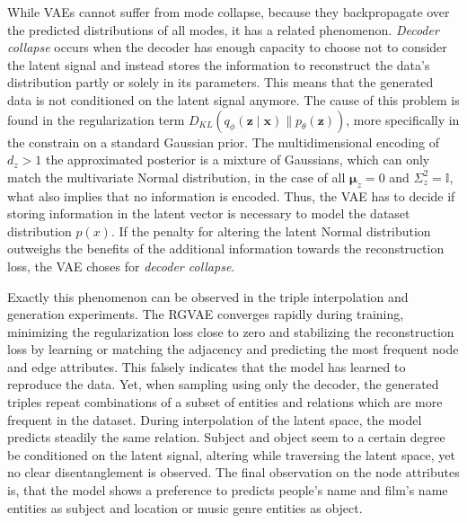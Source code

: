 While VAEs cannot suffer from mode collapse, because they backpropagate over the predicted distributions of all modes, it has a related phenomenon. \textit{Decoder collapse} occurs when the decoder has enough capacity to choose not to consider the latent signal and instead stores the information to reconstruct the data's distribution partly or solely in its parameters. This means that the generated data is not conditioned on the latent signal anymore. The cause of this problem is found in the regularization term $D_{K L}\left(q_{{\phi}}\left(\mathbf{z} \mid \mathbf{x}\right) \| p_{{\theta}}(\mathbf{z})\right)$, more specifically in the constrain on a standard Gaussian prior. The multidimensional encoding of $d_z>1$ the approximated posterior is a mixture of Gaussians, which can only match the multivariate Normal distribution, in the case of all $\mathbf{\mu}_z=0$ and $\Sigma^2_z=\mathbb{I}$, what also implies that no information is encoded. Thus, the VAE has to decide if storing information in the latent vector is necessary to model the dataset distribution $p(x)$. If the penalty for altering the latent Normal distribution outweighs the benefits of the additional information towards the reconstruction loss, the VAE choses for \textit{decoder collapse}. 




Exactly this phenomenon can be observed in the triple interpolation and generation experiments. The RGVAE converges rapidly during training, minimizing the regularization loss close to zero and stabilizing the reconstruction loss by learning or matching the adjacency and predicting the most frequent node and edge attributes. This falsely indicates that the model has learned to reproduce the data. Yet, when sampling using only the decoder, the generated triples repeat combinations of a subset of entities and relations which are more frequent in the dataset. During interpolation of the latent space, the model predicts steadily the same relation. Subject and object seem to a certain degree be conditioned on the latent signal, altering while traversing the latent space, yet no clear disentanglement is observed. The final observation on the node attributes is, that the model shows a preference to predicts people's name and film's name entities as subject and location or music genre entities as object.

